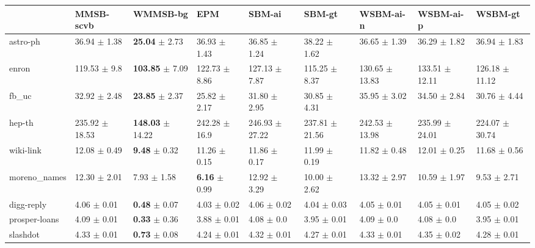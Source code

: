 \begin{tabular}{lllllllll}
\hline
               & MMSB-scvb           & WMMSB-bg                      & EPM                               & SBM-ai              & SBM-gt              & WSBM-ai-n           & WSBM-ai-p           & WSBM-gt             \\                              
\hline                                                                                           
 astro-ph      & 36.94 $\pm$ 1.38   & \textbf{25.04} $\pm$ 2.73   & 36.93 $\pm$ 1.43           & 36.85 $\pm$ 1.24   & 38.22 $\pm$ 1.62   & 36.65 $\pm$ 1.39   & 36.29 $\pm$ 1.82   & 36.94 $\pm$ 1.83   \\
 enron         & 119.53 $\pm$ 9.8   & \textbf{103.85} $\pm$ 7.09  & 122.73 $\pm$ 8.86         & 127.13 $\pm$ 7.87  & 115.25 $\pm$ 8.37  & 130.65 $\pm$ 13.83 & 133.51 $\pm$ 12.11 & 126.18 $\pm$ 11.12 \\
 fb\_uc        & 32.92 $\pm$ 2.48   & \textbf{23.85} $\pm$ 2.37   & 25.82  $\pm$ 2.17         & 31.80 $\pm$ 2.95   & 30.85 $\pm$ 4.31   & 35.95 $\pm$ 3.02   & 34.50 $\pm$ 2.84   & 30.76 $\pm$ 4.44   \\
 hep-th        & 235.92 $\pm$ 18.53 & \textbf{148.03} $\pm$ 14.22 & 242.28 $\pm$ 16.9          & 246.93 $\pm$ 27.22 & 237.81 $\pm$ 21.56 & 242.53 $\pm$ 13.98 & 235.99 $\pm$ 24.01 & 224.07 $\pm$ 30.74 \\
 wiki-link     & 12.08 $\pm$ 0.49   & \textbf{9.48} $\pm$ 0.32    & 11.26  $\pm$ 0.15         & 11.86 $\pm$ 0.17   & 11.99 $\pm$ 0.19   & 11.82 $\pm$ 0.48   & 12.01 $\pm$ 0.25   & 11.68 $\pm$ 0.56   \\
 moreno\_names & 12.30 $\pm$ 2.01   & 7.93 $\pm$ 1.58             & \textbf{6.16}   $\pm$ 0.99 & 12.92 $\pm$ 3.29   & 10.00 $\pm$ 2.62   & 13.32 $\pm$ 2.97   & 10.59 $\pm$ 1.97   & 9.53 $\pm$ 2.71    \\
 digg-reply    & 4.06 $\pm$ 0.01    & \textbf{0.48} $\pm$ 0.07    & 4.03   $\pm$ 0.02         & 4.06 $\pm$ 0.02    & 4.04 $\pm$ 0.03    & 4.05 $\pm$ 0.01    & 4.05 $\pm$ 0.01    & 4.05 $\pm$ 0.02    \\
 prosper-loans & 4.09 $\pm$ 0.01    & \textbf{0.33} $\pm$ 0.36    & 3.88   $\pm$ 0.01         & 4.08 $\pm$ 0.0     & 3.95 $\pm$ 0.01    & 4.09 $\pm$ 0.0     & 4.08 $\pm$ 0.0     & 3.95 $\pm$ 0.01    \\
 slashdot      & 4.33 $\pm$ 0.01    & \textbf{0.73} $\pm$ 0.08    & 4.24   $\pm$ 0.01         & 4.32 $\pm$ 0.01    & 4.27 $\pm$ 0.01    & 4.33 $\pm$ 0.01    & 4.35 $\pm$ 0.02    & 4.28 $\pm$ 0.01    \\
\hline
\end{tabular}

